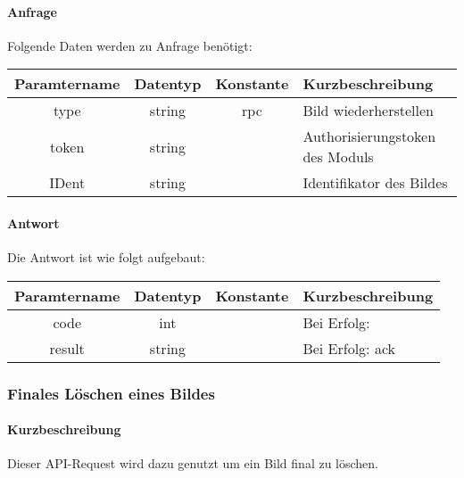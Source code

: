 \paragraph{Anfrage}Folgende Daten werden zu Anfrage benötigt:
\begin{table}[H]
	\begin{tabular}{|c|c|c|p{6.5cm}|}
		\hline
		\textbf{Paramtername} & \textbf{Datentyp} & \textbf{Konstante} & \textbf{Kurzbeschreibung}                                                                                               \\ \hline
		type                & string            & rpc                & Bild wiederherstellen\\ \hline
		token               & string            &                    & Authorisierungstoken des Moduls \\ \hline
		IDent               & string            &                    & Identifikator des Bildes \\ \hline
	\end{tabular}
\end{table}
\paragraph{Antwort}Die Antwort ist wie folgt aufgebaut:
\begin{table}[H]
	\begin{tabular}{|c|c|c|p{6.5cm}|}
		\hline
		\textbf{Paramtername} & \textbf{Datentyp} & \textbf{Konstante} & \textbf{Kurzbeschreibung}            \\ \hline                
		code                & int              &                 & Bei Erfolg: {\glqq 0\grqq} \\ \hline
		result              & string           &                 & Bei Erfolg: {\glqq ack\grqq} \\ \hline
	\end{tabular}
\end{table}
\subsubsection{Finales Löschen eines Bildes}
\paragraph{Kurzbeschreibung}Dieser API-Request wird dazu genutzt um ein Bild final zu löschen.

